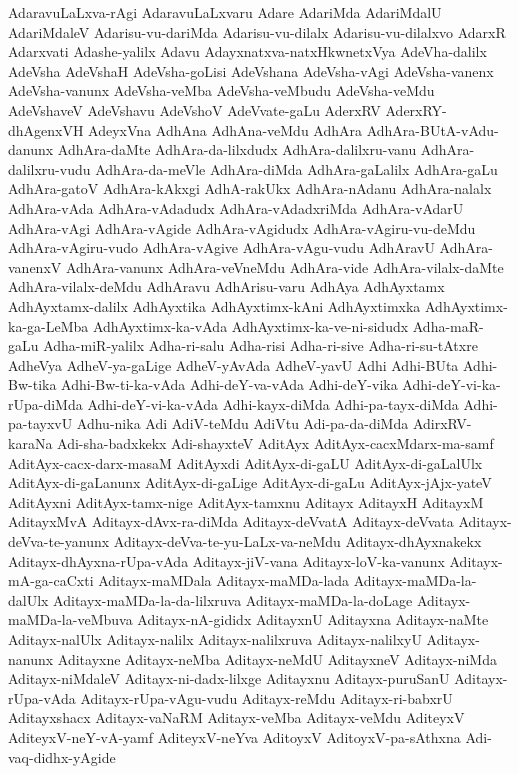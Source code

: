 {AdaravuLaLxva-rAgi
AdaravuLaLxvaru
Adare
AdariMda
AdariMdalU
AdariMdaleV
Adarisu-vu-dariMda
Adarisu-vu-dilalx
Adarisu-vu-dilalxvo
AdarxR
Adarxvati
Adashe-yalilx
Adavu
Adayxnatxva-natxHkwnetxVya
AdeVha-dalilx
AdeVsha
AdeVshaH
AdeVsha-goLisi
AdeVshana
AdeVsha-vAgi
AdeVsha-vanenx
AdeVsha-vanunx
AdeVsha-veMba
AdeVsha-veMbudu
AdeVsha-veMdu
AdeVshaveV
AdeVshavu
AdeVshoV
AdeVvate-gaLu
AderxRV
AderxRY-dhAgenxVH
AdeyxVna
AdhAna
AdhAna-veMdu
AdhAra
AdhAra-BUtA-vAdu-danunx
AdhAra-daMte
AdhAra-da-lilxdudx
AdhAra-dalilxru-vanu
AdhAra-dalilxru-vudu
AdhAra-da-meVle
AdhAra-diMda
AdhAra-gaLalilx
AdhAra-gaLu
AdhAra-gatoV
AdhAra-kAkxgi
AdhA-rakUkx
AdhAra-nAdanu
AdhAra-nalalx
AdhAra-vAda
AdhAra-vAdadudx
AdhAra-vAdadxriMda
AdhAra-vAdarU
AdhAra-vAgi
AdhAra-vAgide
AdhAra-vAgidudx
AdhAra-vAgiru-vu-deMdu
AdhAra-vAgiru-vudo
AdhAra-vAgive
AdhAra-vAgu-vudu
AdhAravU
AdhAra-vanenxV
AdhAra-vanunx
AdhAra-veVneMdu
AdhAra-vide
AdhAra-vilalx-daMte
AdhAra-vilalx-deMdu
AdhAravu
AdhArisu-varu
AdhAya
AdhAyxtamx
AdhAyxtamx-dalilx
AdhAyxtika
AdhAyxtimx-kAni
AdhAyxtimxka
AdhAyxtimx-ka-ga-LeMba
AdhAyxtimx-ka-vAda
AdhAyxtimx-ka-ve-ni-sidudx
Adha-maR-gaLu
Adha-miR-yalilx
Adha-ri-salu
Adha-risi
Adha-ri-sive
Adha-ri-su-tAtxre
AdheVya
AdheV-ya-gaLige
AdheV-yAvAda
AdheV-yavU
Adhi
Adhi-BUta
Adhi-Bw-tika
Adhi-Bw-ti-ka-vAda
Adhi-deY-va-vAda
Adhi-deY-vika
Adhi-deY-vi-ka-rUpa-diMda
Adhi-deY-vi-ka-vAda
Adhi-kayx-diMda
Adhi-pa-tayx-diMda
Adhi-pa-tayxvU
Adhu-nika
Adi
AdiV-teMdu
AdiVtu
Adi-pa-da-diMda
AdirxRV-karaNa
Adi-sha-badxkekx
Adi-shayxteV
AditAyx
AditAyx-cacxMdarx-ma-samf
AditAyx-cacx-darx-masaM
AditAyxdi
AditAyx-di-gaLU
AditAyx-di-gaLalUlx
AditAyx-di-gaLanunx
AditAyx-di-gaLige
AditAyx-di-gaLu
AditAyx-jAjx-yateV
AditAyxni
AditAyx-tamx-nige
AditAyx-tamxnu
Aditayx
AditayxH
AditayxM
AditayxMvA
Aditayx-dAvx-ra-diMda
Aditayx-deVvatA
Aditayx-deVvata
Aditayx-deVva-te-yanunx
Aditayx-deVva-te-yu-LaLx-va-neMdu
Aditayx-dhAyxnakekx
Aditayx-dhAyxna-rUpa-vAda
Aditayx-jiV-vana
Aditayx-loV-ka-vanunx
Aditayx-mA-ga-caCxti
Aditayx-maMDala
Aditayx-maMDa-lada
Aditayx-maMDa-la-dalUlx
Aditayx-maMDa-la-da-lilxruva
Aditayx-maMDa-la-doLage
Aditayx-maMDa-la-veMbuva
Aditayx-nA-gididx
AditayxnU
Aditayxna
Aditayx-naMte
Aditayx-nalUlx
Aditayx-nalilx
Aditayx-nalilxruva
Aditayx-nalilxyU
Aditayx-nanunx
Aditayxne
Aditayx-neMba
Aditayx-neMdU
AditayxneV
Aditayx-niMda
Aditayx-niMdaleV
Aditayx-ni-dadx-lilxge
Aditayxnu
Aditayx-puruSanU
Aditayx-rUpa-vAda
Aditayx-rUpa-vAgu-vudu
Aditayx-reMdu
Aditayx-ri-babxrU
Aditayxshacx
Aditayx-vaNaRM
Aditayx-veMba
Aditayx-veMdu
AditeyxV
AditeyxV-neY-vA-yamf
AditeyxV-neYva
AditoyxV
AditoyxV-pa-sAthxna
Adi-vaq-didhx-yAgide
}
